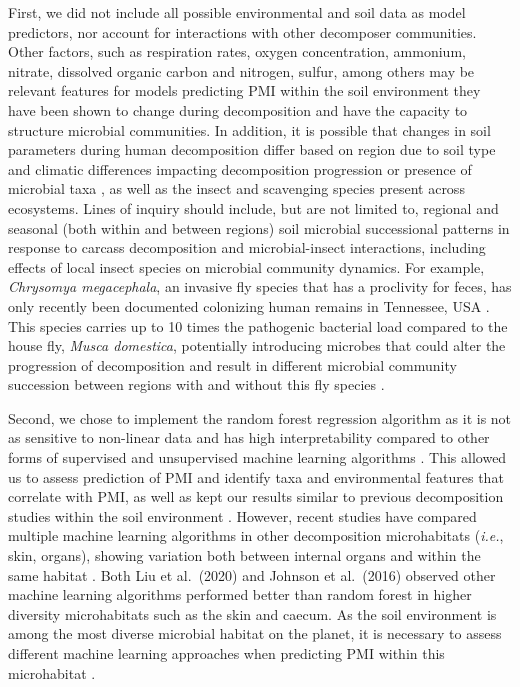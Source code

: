 \documentclass[
  10pt,
  letterpaper,
]{article}
\begin{document}
First, we did not include all possible environmental and soil data as
model predictors, nor account for interactions with other decomposer
communities. Other factors, such as respiration rates, oxygen
concentration, ammonium, nitrate, dissolved organic carbon and nitrogen,
sulfur, among others may be relevant features for models predicting PMI
within the soil environment they have been shown to change during
decomposition
\citep{cobaugh_functional_2015, metcalf_microbial_2016, mason_body_2022, debruyn_comparative_2021, aitkenhead-peterson_mapping_2012, fancher_evaluation_2017, keenan_spatial_2018, keenan_mortality_2018, quaggiotto_dynamic_2019, szelecz_soil_2018, macdonald_carrion_2014, anderson_dynamics_2013, meyer_seasonal_2013, benninger_biochemical_2008, vass_time_1992, taylor_soil_2023}
and have the capacity to structure microbial communities. In addition,
it is possible that changes in soil parameters during human
decomposition differ based on region due to soil type and climatic
differences impacting decomposition progression or presence of microbial
taxa \citep{carter_temperature_2008}, as well as the insect and
scavenging species present across ecosystems. Lines of inquiry should
include, but are not limited to, regional and seasonal (both within and
between regions) soil microbial successional patterns in response to
carcass decomposition and microbial-insect interactions, including
effects of local insect species on microbial community dynamics. For
example, \emph{Chrysomya megacephala}, an invasive fly species that has
a proclivity for feces, has only recently been documented colonizing
human remains in Tennessee, USA \citep{owings_first_2021}. This species
carries up to 10 times the pathogenic bacterial load compared to the
house fly, \emph{Musca domestica}, potentially introducing microbes that
could alter the progression of decomposition and result in different
microbial community succession between regions with and without this fly
species \citep{chaiwong_blow_2014}.

Second, we chose to implement the random forest regression algorithm as
it is not as sensitive to non-linear data and has high interpretability
compared to other forms of supervised and unsupervised machine learning
algorithms \citep{ghannam_machine_2021}. This allowed us to assess
prediction of PMI and identify taxa and environmental features that
correlate with PMI, as well as kept our results similar to previous
decomposition studies within the soil environment
\citep{belk_microbiome_2018}. However, recent studies have compared
multiple machine learning algorithms in other decomposition
microhabitats (\emph{i.e.}, skin, organs), showing variation both
between internal organs \citep{liu_predicting_2020} and within the same
habitat \citep{johnson_machine_2016}. Both Liu et al.~(2020)
\citep{liu_predicting_2020} and Johnson et al.~(2016)
\citep{johnson_machine_2016} observed other machine learning algorithms
performed better than random forest in higher diversity microhabitats
such as the skin and caecum. As the soil environment is among the most
diverse microbial habitat on the planet, it is necessary to assess
different machine learning approaches when predicting PMI within this
microhabitat \citep{metcalf_estimating_2019}.
\end{document}
